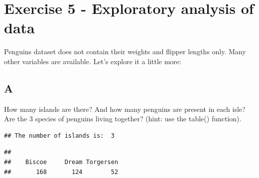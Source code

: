 \documentclass[
]{article}
\newenvironment{Shaded}{\begin{snugshade}}{\end{snugshade}}
\newcommand{\FunctionTok}[1]{\textcolor[rgb]{0.13,0.29,0.53}{\textbf{#1}}}
\newcommand{\NormalTok}[1]{#1}
\newcommand{\SpecialCharTok}[1]{\textcolor[rgb]{0.81,0.36,0.00}{\textbf{#1}}}
\newcommand{\StringTok}[1]{\textcolor[rgb]{0.31,0.60,0.02}{#1}}
\begin{document}
\hypertarget{exercise-5---exploratory-analysis-of-data}{%
\section{Exercise 5 - Exploratory analysis of
data}\label{exercise-5---exploratory-analysis-of-data}}

Penguins dataset does not contain their weights and flipper lengths
only. Many other variables are available. Let's explore it a little
more:

\hypertarget{a-4}{%
\subsection{A}\label{a-4}}

How many islands are there? And how many penguins are present in each
isle? Are the 3 species of penguins living together? (hint: use the
table() function).

\begin{Shaded}
\end{Shaded}

\begin{verbatim}
## The number of islands is:  3
\end{verbatim}

\begin{Shaded}
\end{Shaded}

\begin{verbatim}
## 
##    Biscoe     Dream Torgersen 
##       168       124        52
\end{verbatim}

\begin{Shaded}
\end{Shaded}
\end{document}
